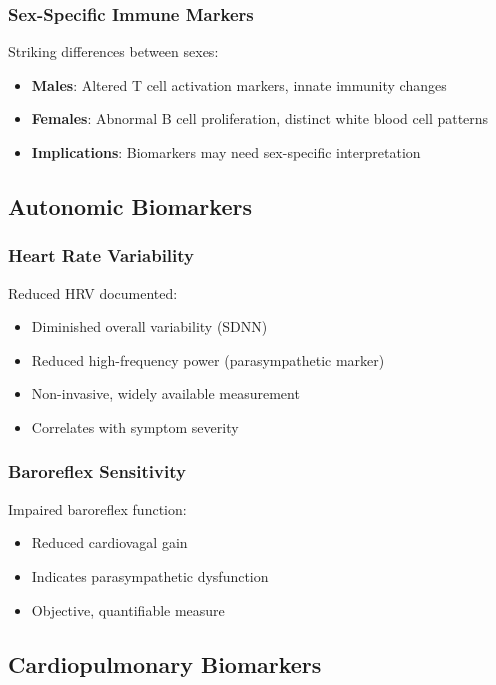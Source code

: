 \subsubsection{Sex-Specific Immune Markers}
Striking differences between sexes:
\begin{itemize}
    \item \textbf{Males}: Altered T cell activation markers, innate immunity changes
    \item \textbf{Females}: Abnormal B cell proliferation, distinct white blood cell patterns
    \item \textbf{Implications}: Biomarkers may need sex-specific interpretation
\end{itemize}

\subsection{Autonomic Biomarkers}

\subsubsection{Heart Rate Variability}
Reduced HRV documented:
\begin{itemize}
    \item Diminished overall variability (SDNN)
    \item Reduced high-frequency power (parasympathetic marker)
    \item Non-invasive, widely available measurement
    \item Correlates with symptom severity
\end{itemize}

\subsubsection{Baroreflex Sensitivity}
Impaired baroreflex function:
\begin{itemize}
    \item Reduced cardiovagal gain
    \item Indicates parasympathetic dysfunction
    \item Objective, quantifiable measure
\end{itemize}

\subsection{Cardiopulmonary Biomarkers}

